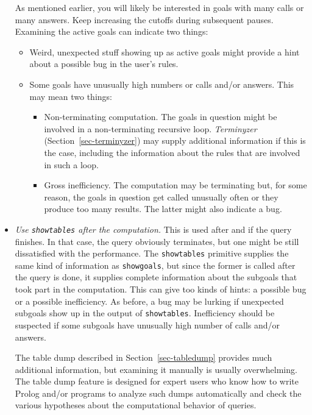 \begin{itemize}
    As mentioned earlier, you will likely be interested in goals with many
    calls or many answers. Keep increasing the cutoffs during subsequent
    pauses. Examining the active goals can indicate two things:
    \begin{itemize}
    \item   Weird, unexpected stuff showing up as active goals
      might provide a hint about a possible bug in the user's rules.
    \item  Some goals have unusually high numbers or calls and/or answers.
      This may mean two things:
      \begin{itemize}
      \item      Non-terminating computation. The goals in question might
        be involved in a non-terminating recursive loop. \emph{Terminyzer}
        (Section~\ref{sec-terminyzer}) may
        supply additional information if this is the case, including the
        information about the rules that are involved in such a loop.
      \item  Gross inefficiency. The computation may be terminating but,
        for some reason, the goals in question get called unusually often or
        they produce too many results. The latter might also indicate a
        bug.
      \end{itemize}
    \end{itemize}

  \item \emph{Use \texttt{showtables} after the computation.}
    This is used after and if the query finishes. In that case, the query
    obviously terminates, but one might be still dissatisfied with the
    performance. The \texttt{showtables} primitive supplies the same kind
    of information as \texttt{showgoals}, but since the former is called
    after the query is done, it supplies complete information about the
    subgoals that took part in the computation.
    This can give too kinds of hints:
    a possible bug or a possible inefficiency. As before, a bug may be
    lurking if unexpected subgoals show up in the output of
    \texttt{showtables}. Inefficiency should be suspected if some subgoals
    have unusually high number of calls and/or answers.

    The table dump described in Section~\ref{sec-tabledump} provides much
    additional information, but examining it manually is usually overwhelming.
    The table dump feature is designed for expert users who know how to
    write Prolog and/or \ERGO programs to analyze such dumps automatically
    and check the various hypotheses about the computational behavior of
    queries.
  \end{itemize}

